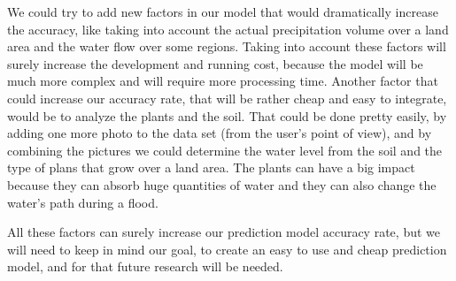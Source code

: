 \documentclass[12pt, a4paper]{report}
\begin{document}
We could try to add new factors in our model that would dramatically increase the accuracy, like taking into account the actual precipitation volume over a land area and the water flow over some regions. Taking into account these factors will surely increase the development and running cost, because the model will be much more complex and will require more processing time. Another factor that could increase our accuracy rate, that will be rather cheap and easy to integrate, would be to analyze the plants and the soil. That could be done pretty easily, by adding one more photo to the data set (from the user's point of view), and by combining the pictures we could determine the water level from the soil and the type of plans that grow over a land area. The plants can have a big impact because they can absorb huge quantities of water and they can also change the water's path during a flood.
\par 
All these factors can surely increase our prediction model accuracy rate, but we will need to keep in mind our goal, to create an easy to use and cheap prediction model, and for that future research will be needed.




\renewcommand{\bibname}{Bibliography}

\end{document}
